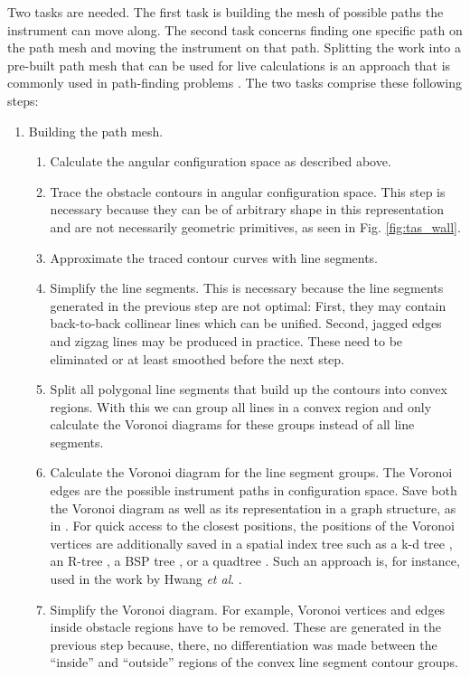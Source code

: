Two tasks are needed. The first task is building the mesh of possible paths the 
instrument can move along. 
The second task concerns finding one specific path on the path mesh and moving
the instrument on that path. 
Splitting the work into a pre-built path mesh that can be used for live calculations
is an approach that is commonly used in path-finding problems \cite{Hwang2003}.
The two tasks comprise these following steps:
\begin{enumerate}
	\item Building the path mesh.
	\begin{enumerate}
		\item Calculate the angular configuration space as described above.
		\item Trace the obstacle contours in angular configuration space. 
			This step is necessary because they can be of arbitrary
			shape in this representation and are not necessarily geometric 
			primitives, as seen in Fig. \ref{fig:tas_wall}.
		\item Approximate the traced contour curves with line segments.
		\item Simplify the line segments. This is necessary because the line 
			segments generated in the previous step are not optimal:
			First, they may contain back-to-back collinear lines which can be 
			unified. Second, jagged edges and zigzag lines may be
			produced in practice. These need to be eliminated or at least smoothed 
			before the next step.
		\item Split all polygonal line segments that build up the contours into 
			convex regions. With this we can group all lines in a convex region 
			and only calculate the Voronoi diagrams for these groups instead of 
			all line segments.
		\item Calculate the Voronoi diagram for the line segment groups. 
			The Voronoi edges are the possible instrument paths in configuration 
			space. Save both the Voronoi diagram as well as its representation 
			in a graph structure, as in \cite[p. 163]{Berg2008}.
			For quick access to the closest positions, the positions of the
			Voronoi vertices are additionally saved in a spatial index tree such as a 
			k-d tree \cite{TODO}, an R-tree \cite{TODO}, a BSP tree \cite{TODO}, 
			or a quadtree \cite{TODO}. 
			Such an approach is, for instance, used in the work by 
			Hwang \textit{et al}. \cite{Hwang2003}.
		\item Simplify the Voronoi diagram. For example, Voronoi vertices and 
			edges inside obstacle regions have to be removed.
			These are generated in the previous step because, there, no 
			differentiation was made between the ``inside'' and ``outside'' 
			regions of the convex line segment contour groups.
	\end{enumerate}


\end{enumerate}
